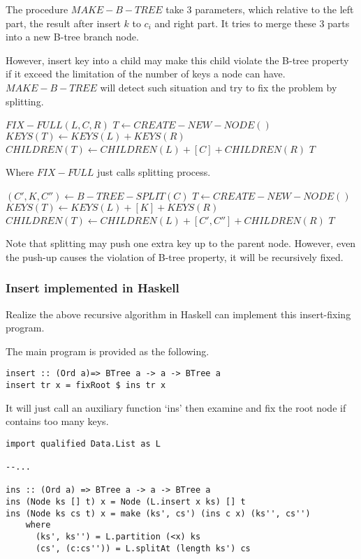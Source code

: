 \documentclass{article}
\begin{document}
The procedure $MAKE-B-TREE$ take 3 parameters, which relative to
the left part, the result after insert $k$ to $c_i$ and right part.
It tries to merge these 3 parts into a new B-tree branch node.

However, insert key into a child may make this child violate the
B-tree property if it exceed the limitation of the number of keys
a node can have. $MAKE-B-TREE$ will detect such situation and try
to fix the problem by splitting.

\begin{algorithmic}[1]
    \State \Return $FIX-FULL(L, C, R)$
  \Else
    \State $T \leftarrow CREATE-NEW-NODE()$
    \State $KEYS(T) \leftarrow KEYS(L) + KEYS(R)$
    \State $CHILDREN(T) \leftarrow CHILDREN(L)+[C]+CHILDREN(R)$
    \State \Return $T$
  \EndIf
\EndFunction
\end{algorithmic}

Where $FIX-FULL$ just calls splitting process.

\begin{algorithmic}[1]
  \State $(C', K, C'') \leftarrow B-TREE-SPLIT(C)$
  \State $T \leftarrow CREATE-NEW-NODE()$
  \State $KEYS(T) \leftarrow KEYS(L)+[K]+KEYS(R)$
  \State $CHILDREN(T) \leftarrow CHILDREN(L)+[C', C'']+CHILDREN(R)$
  \State \Return $T$
\EndFunction
\end{algorithmic}

Note that splitting may push one extra key up to the parent node.
However, even the push-up causes the violation of B-tree property,
it will be recursively fixed.

\subsubsection*{Insert implemented in Haskell}
Realize the above recursive algorithm in Haskell can implement this
insert-fixing program.

The main program is provided as the following.

\lstset{language=Haskell}
\begin{lstlisting}
insert :: (Ord a)=> BTree a -> a -> BTree a
insert tr x = fixRoot $ ins tr x
\end{lstlisting} %

It will just call an auxiliary function `ins' then examine and
fix the root node if contains too many keys.

\begin{lstlisting}
import qualified Data.List as L

--...

ins :: (Ord a) => BTree a -> a -> BTree a
ins (Node ks [] t) x = Node (L.insert x ks) [] t
ins (Node ks cs t) x = make (ks', cs') (ins c x) (ks'', cs'')
    where
      (ks', ks'') = L.partition (<x) ks
      (cs', (c:cs'')) = L.splitAt (length ks') cs
\end{lstlisting}
\end{document}
